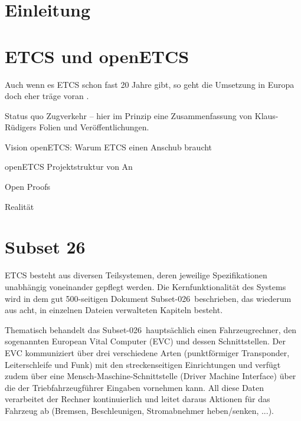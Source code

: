 \documentclass[twoside]{article}
\begin{document}
\begin{multicols}{2}
\noindent 

\section{Einleitung}

\lipsum[2]

\section{ETCS und openETCS}

Auch wenn es ETCS schon fast 20 Jahre gibt, so geht die Umsetzung in Europa doch eher träge voran \cite{traege_umsetzung}.

Status quo Zugverkehr – hier im Prinzip eine Zusammenfassung von Klaus-Rüdigers Folien und Veröffentlichungen.

Vision openETCS: Warum ETCS einen Anschub braucht

openETCS Projektstruktur von An

Open Proofs

Realität

\section{Subset 26}

ETCS besteht aus diversen Teilsystemen, deren jeweilige Spezifikationen unabhängig voneinander gepflegt werden. Die Kernfunktionalität des Systems wird in dem gut 500-seitigen Dokument \glqq Subset-026\grqq\ beschrieben, das wiederum aus acht, in einzelnen Dateien verwalteten Kapiteln besteht.

Thematisch behandelt das \glqq Subset-026\grqq\ hauptsächlich einen Fahrzeugrechner, den sogenannten European Vital Computer (EVC) und dessen Schnittstellen. Der EVC kommuniziert über drei verschiedene Arten (punktförmiger Transponder, Leiterschleife und Funk) mit den streckenseitigen Einrichtungen und verfügt zudem über eine Mensch-Maschine-Schnittstelle (Driver Machine Interface) über die der Triebfahrzeugführer Eingaben vornehmen kann. All diese Daten verarbeitet der Rechner kontinuierlich und leitet daraus Aktionen für das Fahrzeug ab (Bremsen, Beschleunigen, Stromabnehmer heben/senken, ...).


\end{multicols}
\end{document}
